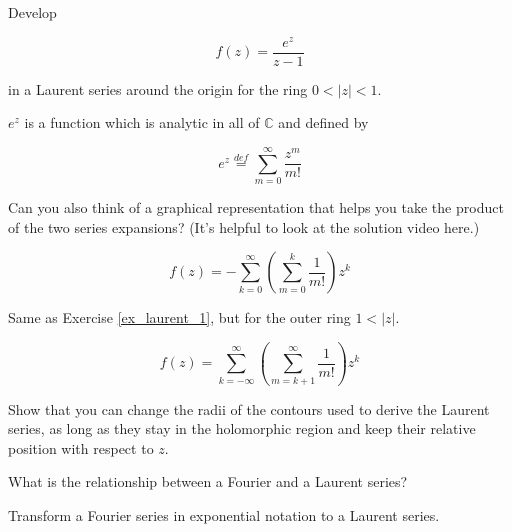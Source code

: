 \begin{exer}
\label{ex_laurent_1}
Develop

$$f(z)=\frac{e^z}{z-1}$$

in a Laurent series around the origin for the ring $0 < | z | < 1$.

$e^z$ is a function which is analytic in all of $\mathbb{C}$ and defined by

$$e^z \stackrel{def}{=} \sum_{m=0}^{\infty} \frac{z^m}{m!} $$

Can you also think of a graphical representation that helps you take the product of the two series expansions? (It's helpful to look at the solution video here.)

\begin{sol}
$$f(z)= - \sum_{k=0}^{\infty} \left(\sum _{m=0}^k \frac{1}{m!} \right) z^k $$
\end{sol}

\end{exer}

\begin{exer}
  Same as Exercise \ref{ex_laurent_1}, but for the outer ring  $1 < | z |$.

\begin{sol}
$$f(z)=  \sum_{k=-\infty}^{\infty} \left(\sum_{m=k+1}^\infty \frac{1}{m!} \right) z^k $$
\end{sol}
  
\end{exer}

\begin{exer}
  Show that you can change the radii of the contours used to derive the Laurent series, as long as they stay in the holomorphic region and keep their relative position with respect to $z$.

\end{exer}

\begin{exer}
What is the relationship between a Fourier and a Laurent series?
  \begin{hnt}
  Transform a Fourier series in exponential notation to a Laurent series.
  \end{hnt}
\end{exer}


\pagebreak




